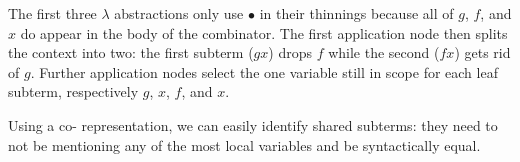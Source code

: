 \codebruijnexamplegraph{}

The first three $\lambda$ abstractions only use $\bullet$ in their thinnings
because all of $g$, $f$, and $x$ do appear in the body of the combinator.
%
The first application node then splits the context into two: the first subterm
($g x$) drops $f$ while the second ($f x$) gets rid of $g$.
%
Further application nodes select the one variable still in scope for each
leaf subterm, respectively $g$, $x$, $f$, and $x$.


Using a co-\DeBruijn{} representation, we can easily identify shared subterms:
they need to not be mentioning any of the most local variables and be
syntactically equal.
